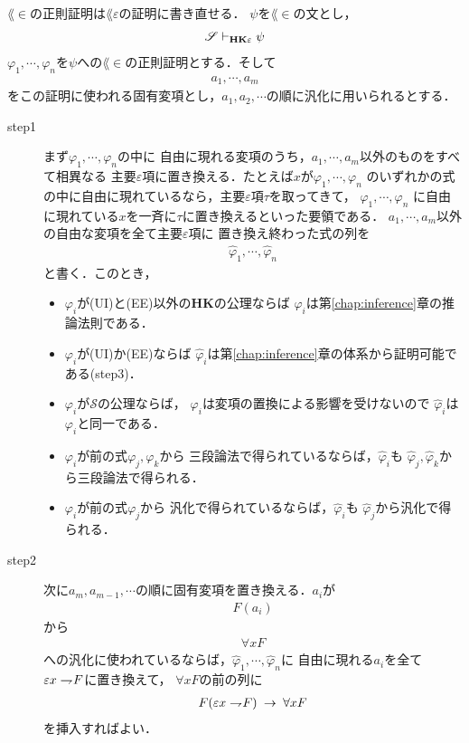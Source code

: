 	$\lang{\in}$の正則証明は$\lang{\varepsilon}$の証明に書き直せる．
	$\psi$を$\lang{\in}$の文とし，
	\begin{align}
		\mathscr{S} \vdash_{{\scriptsize \mbox{{\bf HK$\varepsilon$}}}} \psi
	\end{align}
	$\varphi_{1},\cdots,\varphi_{n}$を$\psi$への$\lang{\in}$の正則証明とする．そして
	\begin{align}
		a_{1},\cdots,a_{m}
	\end{align}
	をこの証明に使われる固有変項とし，$a_{1},a_{2},\cdots$の順に汎化に用いられるとする．
	
	\begin{description}
		\item[step1]
			まず$\varphi_{1},\cdots,\varphi_{n}$の中に
			自由に現れる変項のうち，$a_{1},\cdots,a_{m}$以外のものをすべて相異なる
			主要$\varepsilon$項に置き換える．たとえば$x$が$\varphi_{1},\cdots,\varphi_{n}$
			のいずれかの式の中に自由に現れているなら，主要$\varepsilon$項$\tau$を取ってきて，
			$\varphi_{1},\cdots,\varphi_{n}$
			に自由に現れている$x$を一斉に$\tau$に置き換えるといった要領である．
			$a_{1},\cdots,a_{m}$以外の自由な変項を全て主要$\varepsilon$項に
			置き換え終わった式の列を
			\begin{align}
				\hat{\varphi}_{1}, \cdots, \hat{\varphi}_{n}
			\end{align}
			と書く．このとき，
			\begin{itemize}
				\item $\varphi_{i}$が(UI)と(EE)以外の{\bf HK}の公理ならば
					$\hat{\varphi}_{i}$は第\ref{chap:inference}章の推論法則である．
				\item $\varphi_{i}$が(UI)か(EE)ならば
					$\hat{\varphi}_{i}$は第\ref{chap:inference}章の体系から証明可能である(step3)．
				\item $\varphi_{i}$が$\mathscr{S}$の公理ならば，
					$\varphi_{i}$は変項の置換による影響を受けないので
					$\hat{\varphi}_{i}$は$\varphi_{i}$と同一である．
				\item $\varphi_{i}$が前の式$\varphi_{j},\varphi_{k}$から
					三段論法で得られているならば，$\hat{\varphi}_{i}$も
					$\hat{\varphi}_{j},\hat{\varphi}_{k}$から三段論法で得られる．
				\item $\varphi_{i}$が前の式$\varphi_{j}$から
					汎化で得られているならば，$\hat{\varphi}_{i}$も
					$\hat{\varphi}_{j}$から汎化で得られる．
			\end{itemize}
			
		\item[step2]
			次に$a_{m},a_{m-1},\cdots$の順に固有変項を置き換える．$a_{i}$が
			\begin{align}
				F(a_{i})
			\end{align}
			から
			\begin{align}
				\forall x F
			\end{align}
			への汎化に使われているならば，$\hat{\varphi}_{1}, \cdots, \hat{\varphi}_{n}$に
			自由に現れる$a_{i}$を全て$\varepsilon x \rightharpoondown\hspace{-0.25em} F$に置き換えて，
			$\forall x F$の前の列に
			\begin{align}
				F(\varepsilon x \rightharpoondown\hspace{-0.25em} F) \hspace{0.25em}\rightarrow\hspace{0.25em} \forall x F
			\end{align}
			を挿入すればよい．
		

\end{description}
